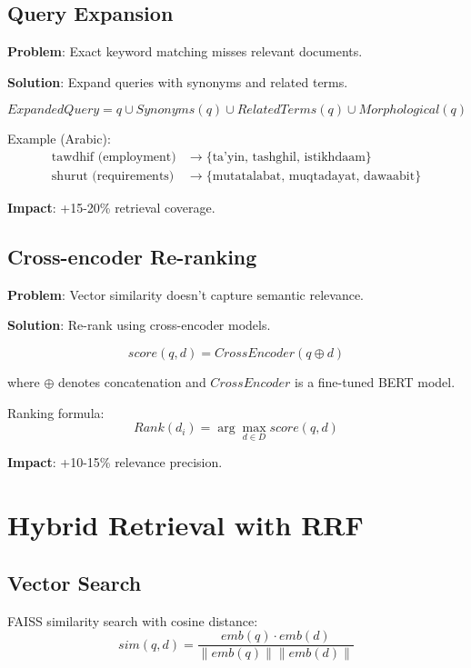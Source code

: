 \documentclass[12pt,a4paper]{article}
\begin{document}
\subsection{Query Expansion}

\textbf{Problem}: Exact keyword matching misses relevant documents.

\textbf{Solution}: Expand queries with synonyms and related terms.

\begin{equation}
ExpandedQuery = q \cup Synonyms(q) \cup RelatedTerms(q) \cup Morphological(q)
\end{equation}

Example (Arabic):
\begin{align*}
\text{tawdhif (employment)} &\rightarrow \{\text{ta'yin, tashghil, istikhdaam}\} \\
\text{shurut (requirements)} &\rightarrow \{\text{mutatalabat, muqtadayat, dawaabit}\}
\end{align*}

\textbf{Impact}: +15-20\% retrieval coverage.

\subsection{Cross-encoder Re-ranking}

\textbf{Problem}: Vector similarity doesn't capture semantic relevance.

\textbf{Solution}: Re-rank using cross-encoder models.

\begin{equation}
score(q, d) = CrossEncoder(q \oplus d)
\end{equation}

where $\oplus$ denotes concatenation and $CrossEncoder$ is a fine-tuned BERT model.

Ranking formula:
\begin{equation}
Rank(d_i) = \arg\max_{d \in D} score(q, d)
\end{equation}

\textbf{Impact}: +10-15\% relevance precision.

\section{Hybrid Retrieval with RRF}

\subsection{Vector Search}
FAISS similarity search with cosine distance:
\begin{equation}
sim(q, d) = \frac{emb(q) \cdot emb(d)}{\|emb(q)\| \|emb(d)\|}
\end{equation}
\end{document}

